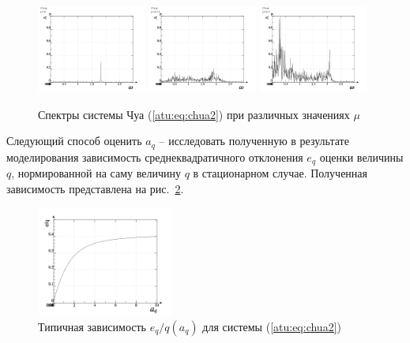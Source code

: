 \documentclass[a4paper,12pt]{article}
\begin{document}
\begin{figure}[htb!]
\centerline{
  \includegraphics[width=0.32\textwidth]{p/cha/chua/chua_f-p_f_mu=2x00.png}
  \includegraphics[width=0.32\textwidth]{p/cha/chua/chua_f-p_f_mu=2x74.png}
  \includegraphics[width=0.32\textwidth]{p/cha/chua/chua_f-p_f_mu=4x50.png}
}
\caption{Спектры системы Чуа (\ref{atu:eq:chua2}) при различных значениях $\mu$}
\label{atu:f:chua_spectrum}
\end{figure}

Следующий способ оценить $a_q$ -- исследовать полученную в результате моделирования
зависимость среднеквадратичного отклонения $e_q$ оценки величины $q$, нормированной
на саму величину $q$ в стационарном случае. Полученная зависимость представлена
на рис.~\ref{atu:f:chua_tau}.

\begin{figure}[htb!]
\centerline{
  \includegraphics[width=0.4\textwidth]{p/cha/chua/chua_tau-p_e_a.png}
}
\caption{Типичная зависимость $e_q/q(a_q)$ для системы (\ref{atu:eq:chua2})}
\label{atu:f:chua_tau}
\end{figure}
\end{document}

